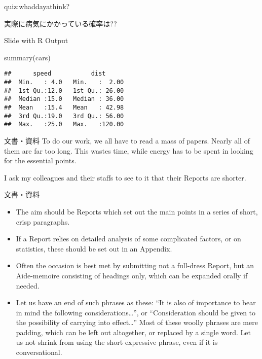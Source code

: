 \documentclass[
  ignorenonframetext,
]{beamer}
\newenvironment{Shaded}{\begin{snugshade}}{\end{snugshade}}
\newcommand{\FunctionTok}[1]{\textcolor[rgb]{0.00,0.00,0.00}{#1}}
\newcommand{\NormalTok}[1]{#1}
\providecommand{\tightlist}{%
  \setlength{\itemsep}{0pt}\setlength{\parskip}{0pt}}
\let\oldShaded\Shaded
\let\endoldShaded\endShaded
\renewenvironment{Shaded}{\footnotesize\oldShaded}{\endoldShaded}
\begin{document}
\begin{frame}{quiz:whaddayathink?}
\protect\hypertarget{quizwhaddayathink-4}{}
\Huge

実際に病気にかかっている確率は??
\end{frame}

\begin{frame}[fragile]{Slide with R Output}
\protect\hypertarget{slide-with-r-output}{}
\begin{Shaded}
\begin{Highlighting}[]
\FunctionTok{summary}\NormalTok{(cars)}
\end{Highlighting}
\end{Shaded}

\begin{verbatim}
##      speed           dist       
##  Min.   : 4.0   Min.   :  2.00  
##  1st Qu.:12.0   1st Qu.: 26.00  
##  Median :15.0   Median : 36.00  
##  Mean   :15.4   Mean   : 42.98  
##  3rd Qu.:19.0   3rd Qu.: 56.00  
##  Max.   :25.0   Max.   :120.00
\end{verbatim}
\end{frame}

\begin{frame}{文書・資料}
\protect\hypertarget{ux6587ux66f8ux8cc7ux6599}{}
To do our work, we all have to read a mass of papers. Nearly all of them
are far too long. This wastes time, while energy has to be spent in
looking for the essential points.

I ask my colleagues and their staffs to see to it that their Reports are
shorter.
\end{frame}

\begin{frame}{文書・資料}
\protect\hypertarget{ux6587ux66f8ux8cc7ux6599-1}{}
\begin{itemize}[<+->]
\tightlist
\item
  \textbullet{}\hspace{2pt} The aim should be Reports which set out the
  main points in a series of short, crisp paragraphs.
\item
  \textbullet{}\hspace{2pt} If a Report relies on detailed analysis of
  some complicated factors, or on statistics, these should be set out in
  an Appendix.
\item
  \textbullet{}\hspace{2pt} Often the occasion is best met by submitting
  not a full-dress Report, but an Aide-memoire consisting of headings
  only, which can be expanded orally if needed.
\item
  \textbullet\hspace{2pt}Let us have an end of such phrases as these:
  ``It is also of importance to bear in mind the following
  considerations\ldots{}'', or ``Consideration should be given to the
  possibility of carrying into effect\ldots{}'' Most of these woolly
  phrases are mere padding, which can be left out altogether, or
  replaced by a single word. Let us not shrink from using the short
  expressive phrase, even if it is conversational.
\end{itemize}
\end{frame}
\end{document}

